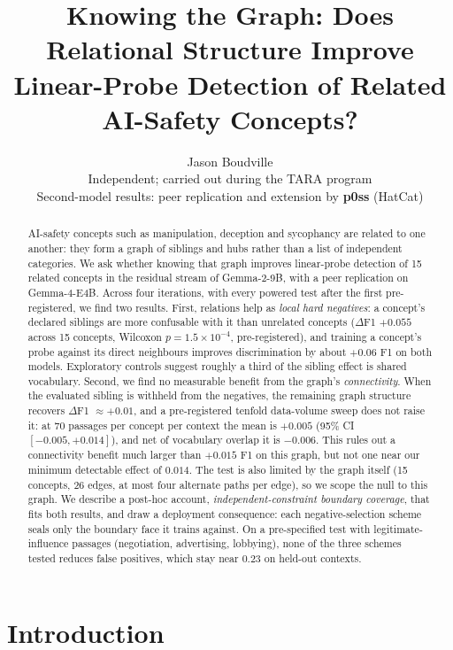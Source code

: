 \documentclass[11pt]{article}
\title{Knowing the Graph: Does Relational Structure Improve\\Linear-Probe Detection of Related AI-Safety Concepts?}
\author{Jason Boudville\\[2pt]
\small Independent; carried out during the TARA program\\[6pt]
\small Second-model results: peer replication and extension by \textbf{p0ss} (HatCat)}
\date{}
\newcommand{\dF}{$\Delta$F1}
\begin{document}
\maketitle

\begin{abstract}
AI-safety concepts such as manipulation, deception and sycophancy are related to one another: they form a
graph of siblings and hubs rather than a list of independent categories. We ask whether knowing that graph
improves linear-probe detection of 15 related concepts in the residual stream of Gemma-2-9B, with a
peer replication on Gemma-4-E4B. Across four iterations, with every powered test after the first pre-registered,
we find two results. First, relations help as \emph{local hard negatives}: a concept's declared siblings are
more confusable with it than unrelated concepts (\dF{} $+0.055$ across 15 concepts, Wilcoxon
$p=1.5\times10^{-4}$, pre-registered), and training a concept's probe against its direct neighbours improves
discrimination by about $+0.06$ F1 on both models. Exploratory controls suggest roughly a third of the sibling
effect is shared vocabulary. Second, we find no measurable benefit from the graph's \emph{connectivity}. When the
evaluated sibling is withheld from the negatives, the remaining graph structure recovers \dF{} $\approx +0.01$,
and a pre-registered tenfold data-volume sweep does not raise it: at 70 passages per concept per context the
mean is $+0.005$ (95\% CI $[-0.005, +0.014]$), and net of vocabulary overlap it is $-0.006$. This rules out a
connectivity benefit much larger than $+0.015$ F1 on this graph, but not one near our minimum detectable effect
of $0.014$. The test is also limited by the graph itself (15 concepts, 26 edges, at most four alternate paths
per edge), so we scope the null to this graph. We describe a post-hoc account, \emph{independent-constraint
boundary coverage}, that fits both results, and draw a deployment consequence: each negative-selection scheme
seals only the boundary face it trains against. On a pre-specified test with legitimate-influence passages
(negotiation, advertising, lobbying), none of the three schemes tested reduces false positives, which stay near $0.23$ on held-out
contexts.
\end{abstract}

\section{Introduction}
\end{document}
